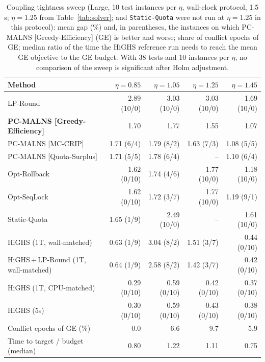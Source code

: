\begin{table}[pos=!htb]
\centering
\caption{Coupling tightness sweep (Large, 10 test instances per $\eta$, wall-clock protocol, 1.5 s; $\eta = 1.25$ from Table~\ref{tab:solver}; \pqs{} and \texttt{Static-Quota} were not run at $\eta = 1.25$ in this protocol): mean gap (\%) and, in parentheses, the instances on which PC-MALNS [Greedy-Efficiency] (GE) is better and worse; share of conflict epochs of GE; median ratio of the time the HiGHS reference run needs to reach the mean GE objective to the GE budget. With 38 tests and 10 instances per $\eta$, no comparison of the sweep is significant after Holm adjustment.}
\label{tab:sweep}
\scriptsize
\begin{tabular}{@{}lrrrr@{}}
\toprule
Method & $\eta = 0.85$ & $\eta = 1.05$ & $\eta = 1.25$ & $\eta = 1.45$ \\
\midrule
LP-Round & 2.89 (10/0) & 3.03 (10/0) & 3.03 (10/0) & 1.69 (10/0) \\
\textbf{PC-MALNS [Greedy-Efficiency]} & 1.70 & 1.77 & 1.55 & 1.07 \\
PC-MALNS [MC-CRIP] & 1.71 (6/4) & 1.79 (8/2) & 1.63 (7/3) & 1.08 (5/5) \\
PC-MALNS [Quota-Surplus] & 1.71 (5/5) & 1.78 (6/4) & -- & 1.10 (6/4) \\
Opt-Rollback & 1.62 (0/10) & 1.74 (4/6) & 1.77 (10/0) & 1.18 (10/0) \\
Opt-SeqLock & 1.62 (0/10) & 1.72 (3/7) & 1.77 (10/0) & 1.19 (9/1) \\
Static-Quota & 1.65 (1/9) & 2.49 (10/0) & -- & 1.61 (10/0) \\
HiGHS (1T, wall-matched) & 0.63 (1/9) & 3.04 (8/2) & 1.51 (3/7) & 0.44 (0/10) \\
HiGHS\,+\,LP-Round (1T, wall-matched) & 0.64 (1/9) & 2.58 (8/2) & 1.42 (3/7) & 0.42 (0/10) \\
HiGHS (1T, CPU-matched) & 0.29 (0/10) & 0.59 (0/10) & 0.42 (0/10) & 0.37 (0/10) \\
HiGHS (5s) & 0.30 (0/10) & 0.59 (0/10) & 0.43 (0/10) & 0.38 (0/10) \\
\addlinespace
Conflict epochs of GE (\%) & 0.0 & 6.6 & 9.7 & 5.9 \\
Time to target / budget (median) & 0.80 & 1.22 & 1.11 & 0.75 \\
\bottomrule
\end{tabular}
\end{table}
